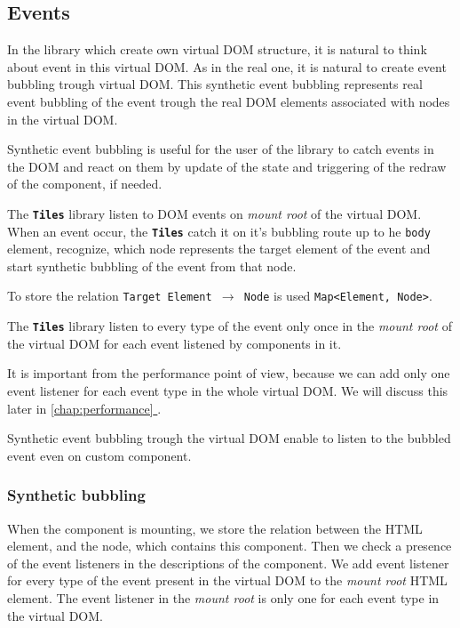 \documentclass[oneside, 12pt]{book}
\newcommand*{\fullref}[1]{\hyperref[{#1}]{\autoref*{#1} \nameref*{#1}}}
\newcommand{\tiles}[0]{\textbf{\texttt{Tiles}} }
\begin{document}
  \subsection{Events}\label{subsec:our-architecture-events}

    In the library which create own virtual DOM structure, it is natural to think about event in this virtual DOM. 
    As in the real one, it is natural to create event bubbling trough virtual DOM. 
    This synthetic event bubbling represents real event bubbling of the event 
    trough the real DOM elements associated with nodes in the virtual DOM.

    Synthetic event bubbling is useful for the user of the library to catch events in the DOM and react on them by update of the state 
    and triggering of the redraw of the component, if needed. 

    The \tiles library listen to DOM events on \textit{mount root} of the virtual DOM.
    When an event occur, the \tiles catch it on it's bubbling route up to he \texttt{body} element, 
    recognize, which node represents the target element of the event and start synthetic bubbling of the event from that node. 

    To store the relation \mbox{\texttt{Target Element $\rightarrow$ Node}} is used \texttt{Map<Element, Node>}.

    The \tiles library listen to every type of the event only once in the \textit{mount root} 
    of the virtual DOM for each event listened by components in it.

    It is important from the performance point of view, because we can add only one event listener for each event type in the whole virtual DOM.
    We will discuss this later in \fullref{chap:performance}.

    Synthetic event bubbling trough the virtual DOM enable to listen to the bubbled event even on custom component.

    \subsubsection{Synthetic bubbling}\label{subsec:our-architecture-events-bubbling}

      When the component is mounting, we store the relation between the HTML element, and the node, which contains this component. 
      Then we check a presence of the event listeners in the descriptions of the component. 
      We add event listener for every type of the event present in the virtual DOM to the \textit{mount root} HTML element. 
      The event listener in the \textit{mount root} is only one for each event type in the virtual DOM.
\end{document}
